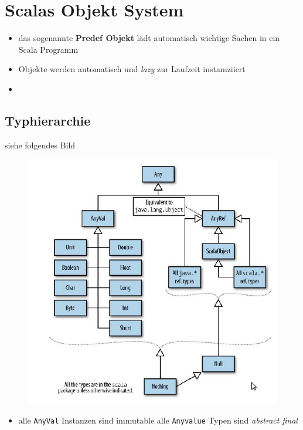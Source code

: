 \section{Scalas Objekt System}
\begin{itemize}
  \item das sogenannte \textbf{Predef Objekt} lädt automatisch
wichtige Sachen in ein Scala Programm
  \item Objekte werden automatisch und \textit{lazy} zur Laufzeit
  instamziiert 
  \item 
\end{itemize}


\subsection{Typhierarchie}
siehe folgendes Bild

\begin{figure}
\begin{center}
\includegraphics[scale=0.7]{bilder/typhierarchie.png}
\end{center}
\end{figure}


\begin{itemize}
  \item alle \texttt{AnyVal} Instanzen sind immutable \und 
  alle \texttt{Anyvalue} Typen sind \textit{abstract final}
\end{itemize}


